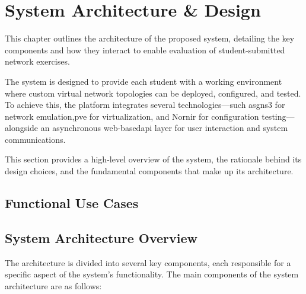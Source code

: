 
\chapter{System Architecture \& Design}


\label{Chapter4SystemArchitectureDesign}


This chapter outlines the architecture of the proposed system, detailing the key components and how they interact to enable 
evaluation of student-submitted network exercises.

The system is designed to provide each student with a working environment where custom virtual network topologies can be 
deployed, configured, and tested. To achieve this, the platform integrates several technologies—such as\ac{gns3} for network 
emulation,\ac{pve} for virtualization, and Nornir for configuration testing—alongside an asynchronous web-based\ac{api} layer for 
user interaction and system communications.

This section provides a high-level overview of the system, the rationale behind its design choices, and the fundamental 
components that make up its architecture.

\section{Functional Use Cases}

\section{System Architecture Overview}
    The architecture is divided into several key components, each responsible for a specific aspect of the system's functionality. 
    The main components of the system architecture are as follows:

